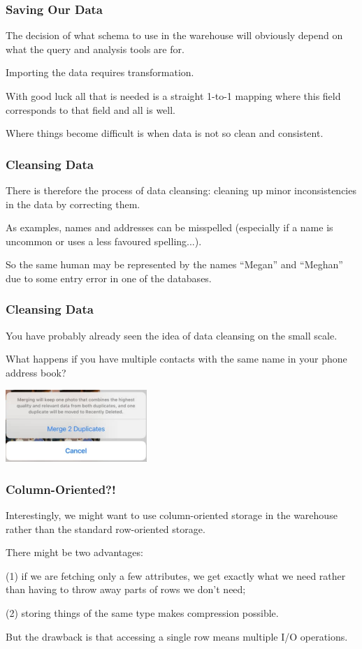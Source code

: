 \begin{frame}
\frametitle{Saving Our Data}

The decision of what schema to use in the warehouse will obviously depend on what the query and analysis tools are for. 

Importing the data requires transformation. 

With good luck all that is needed is a straight 1-to-1 mapping where this field corresponds to that field and all is well.

Where things become difficult is when data is not so clean and consistent.

\end{frame}

\begin{frame}
\frametitle{Cleansing Data}

There is therefore the process of \alert{data cleansing}: cleaning up minor inconsistencies in the data by correcting them. 

As examples, names and addresses can be misspelled (especially if a name is uncommon or uses a less favoured spelling...). 

So the same human may be represented by the names ``Megan'' and ``Meghan'' due to some entry error in one of the databases. 

\end{frame}

\begin{frame}
\frametitle{Cleansing Data}

You have probably already seen the idea of data cleansing on the small scale.

What happens if you have multiple contacts with the same name in your phone address book?

\begin{center}
	\includegraphics[width=0.4\textwidth]{images/duplicates.png}
\end{center}

\end{frame}

\begin{frame}
\frametitle{Column-Oriented?!}

Interestingly, we might want to use column-oriented storage in the warehouse rather than the standard row-oriented storage. 

There might be two advantages: 

(1) if we are fetching only a few attributes, we get exactly what we need rather than having to throw away parts of rows we don't need; 

(2) storing things of the same type makes compression possible. 

But the drawback is that accessing a single row means multiple I/O operations. 


\end{frame}

